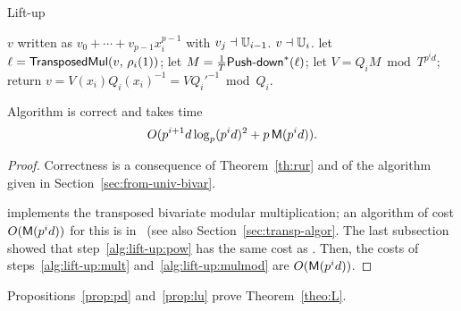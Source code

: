 \begin{algorithm}
  \caption{Lift-up}
  \begin{algorithmic}[1]
    \REQUIRE $v$ written as $v_0+\cdots+v_{p-1}x_i^{p-1}$ with $v_j \dashv \mathbb{U}_{i-1}$.
    \ENSURE $v\dashv \mathbb{U}_i$.
    \STATE \label{alg:lift-up:transmul} let $\ell = {\sf TransposedMul}(v,\,\rho_i(1))$;
    \STATE \label{alg:lift-up:pow} let $M=\frac{1}{T}{\text{\sf Push-down}}^\ast(\ell)$;
    \STATE \label{alg:lift-up:mult} let $V = Q_iM \bmod T^{p^id}$;
    \STATE \label{alg:lift-up:mulmod} return $v=V(x_i)Q_i(x_i)^{-1} = V {Q_i'}^{-1} \bmod Q_i$.
  \end{algorithmic}
\end{algorithm}

\begin{proposition}\label{prop:lu}
  Algorithm  is correct and takes time
  \begin{equation}
    \label{eq:85}
    O(p^{i+1}d\log_p(p^id)^2+p\,\mathsf{M}(p^{i}d))
    \text{.}    
  \end{equation}
\end{proposition}
\begin{proof}
  Correctness is a consequence of Theorem~\ref{th:rur} and of the
  algorithm given in Section~\ref{sec:from-univ-bivar}.

   implements the
  transposed bivariate
  modular multiplication; an algorithm of cost $O(\mathsf{M}(p^id))$ for
  this is in~\cite[Corollary~2]{pascal+schost06} (see also
  Section~\ref{sec:transp-algor}.  The last subsection showed that
  step~\ref{alg:lift-up:pow} has the same cost as
  . Then, the costs of steps~\ref{alg:lift-up:mult}
  and~\ref{alg:lift-up:mulmod} are $O(\mathsf{M}(p^id))$.
\end{proof}

Propositions~\ref{prop:pd} and~\ref{prop:lu} prove
Theorem~\ref{theo:L}.


